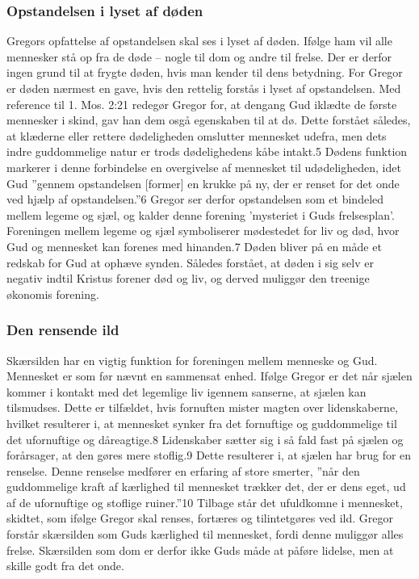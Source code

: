 \subsubsection{Opstandelsen i lyset af døden}
Gregors opfattelse af opstandelsen skal ses i lyset af døden. Ifølge ham vil alle mennesker stå op fra de døde -- nogle til dom og andre til frelse. Der er derfor ingen grund til at frygte døden, hvis man kender til dens betydning. For Gregor er døden nærmest en gave, hvis den rettelig forstås i lyset af opstandelsen. Med reference til 1. Mos. 2:21 redegør Gregor for, at dengang Gud iklædte de første mennesker i skind, gav han dem osgå egenskaben til at dø. Dette forstået således, at klæderne eller rettere dødeligheden omslutter mennesket udefra, men dets indre guddommelige natur er trods dødelighedens kåbe intakt.5 Dødens funktion markerer i denne forbindelse en overgivelse af mennesket til udødeligheden, idet Gud ”gennem opstandelsen [former] en krukke på ny, der er renset for det onde ved hjælp af opstandelsen.”6 Gregor ser derfor opstandelsen som et bindeled mellem legeme og sjæl, og kalder denne forening 'mysteriet i Guds frelsesplan'. Foreningen mellem legeme og sjæl symboliserer mødestedet for liv og død, hvor Gud og mennesket kan forenes med hinanden.7 Døden bliver på en måde et redskab for Gud at ophæve synden. Således forstået, at døden i sig selv er negativ indtil Kristus forener død og liv, og derved muliggør den treenige økonomis forening.

\subsubsection{Den rensende ild}
Skærsilden har en vigtig funktion for foreningen mellem menneske og Gud. Mennesket er som før nævnt en sammensat enhed. Ifølge Gregor er det når sjælen kommer i kontakt med det legemlige liv igennem sanserne, at sjælen kan tilsmudses. Dette er tilfældet, hvis fornuften mister magten over lidenskaberne, hvilket resulterer i, at mennesket synker fra det fornuftige og guddommelige til det ufornuftige og dåreagtige.8 Lidenskaber sætter sig i så fald fast på sjælen og forårsager, at den gøres mere stoflig.9 Dette resulterer i, at sjælen har brug for en renselse. Denne renselse medfører en erfaring af store smerter, ”når den guddommelige kraft af kærlighed til mennesket trækker det, der er dens eget, ud af de ufornuftige og stoflige ruiner.”10 Tilbage står det ufuldkomne i mennesket, skidtet, som ifølge Gregor skal renses, fortæres og tilintetgøres ved ild. Gregor forstår skærsilden som Guds kærlighed til mennesket, fordi denne muliggør alles frelse. Skærsilden som dom er derfor ikke Guds måde at påføre lidelse, men at skille godt fra det onde.

